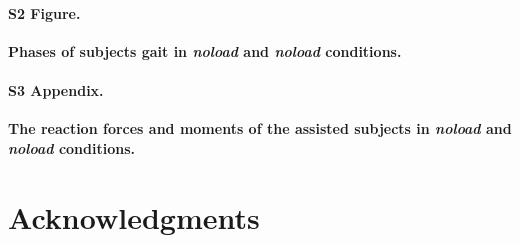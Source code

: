 \documentclass[10pt,letterpaper]{article}
\begin{document}
\paragraph*{S2 Figure.}
\label{S2_Fig}
{\bf Phases of subjects gait in \textit{noload} and \textit{noload} conditions.}

\paragraph*{S3 Appendix.}
\label{S3_Appendix}
{\bf The reaction forces and moments of the assisted subjects in \textit{noload} and \textit{noload} conditions.}

\section*{Acknowledgments}

\nolinenumbers

%
%
% 


\end{document}
